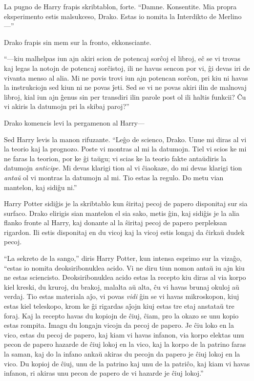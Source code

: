 La pugno de Harry frapis skribtablon, forte. ``Damne. Konsentite. Mia propra eksperimento estis malsukceso, Drako. Estas io nomita la Interdikto de Merlino—''

Drako frapis sin mem sur la fronto, ekkonsciante.

``—kiu malhelpas iun ajn akiri scion de potencaj sorĉoj el libroj, eĉ
se vi trovas kaj legas la notojn de potencaj sorĉistoj, ili ne havus
sencon por vi, ĝi devas iri de vivanta menso al alia. Mi ne povis
trovi iun ajn potencan sorĉon, pri kiu ni havas la instrukciojn sed
kiun ni ne povas ĵeti. Sed se vi ne povas akiri ilin de malnovaj
libroj, kial iun ajn ĝenus sin per transdiri ilin parole post ol ili
haltis funkcii? Ĉu vi akiris la datumojn pri la skibaj paroj?''

Drako komencis levi la pergamenon al Harry—

Sed Harry levis la manon rifuzante. ``Leĝo de scienco, Drako. Unue mi
diras al vi la teorio kaj la prognozo. Poste vi montras al mi la
datumojn. Tiel vi scios ke mi ne faras la teorion, por ke ĝi taŭgu; vi
scias ke la teorio fakte antaŭdiris la datumojn \emph{anticipe.} Mi
devas klarigi tion al vi ĉiaokaze, do mi devas klarigi tion
\emph{antaŭ} ol vi montras la datumojn al mi. Tio estas la regulo. Do
metu vian mantelon, kaj sidiĝu ni.''

Harry Potter sidiĝis je la skribtablo kun ŝiritaj pecoj de papero
disponitaj sur sia surfaco. Drako elirigis sian mantelon el sia sako,
metis ĝin, kaj sidiĝis je la alia flanko fronte al Harry, kaj donante
al la ŝiritaj pecoj de papero perpleksan rigardon. Ili estis
disponitaj en du vicoj kaj la vicoj estis longaj da ĉirkaŭ dudek
pecoj.


``La sekreto de la sango,'' diris Harry Potter, kun intensa esprimo
sur la vizaĝo, ``estas io nomita deoksiribonuklea acido. Vi ne diru
tiun nomon antaŭ iu ajn kiu ne estas sciencisto. Deoksiribonuklea
acido estas la recepto kiu diras al via korpo kiel kreski, du kruroj,
du brakoj, malalta aŭ alta, ĉu vi havas brunaj okuloj aŭ verdaj. Tio
estas materiala aĵo, vi povas \emph{vidi} ĝin se vi havas mikroskopon,
kiuj estas kiel teleskopo, krom ke ĝi rigardas aĵojn kiuj estas tre
etaj anstataŭ tre foraj. Kaj la recepto havas du kopiojn de ĉiuj, ĉiam,
pro la okazo se unu kopio estas rompita. Imagu du longajn vicojn da
pecoj de papero. Je ĉiu loko en la vico, estas du pecoj de papero, kaj
kiam vi havas infanon, via korpo elektas unu pecon de papero hazarde de
ĉiuj lokoj en la vico, kaj la korpo de la patrino faras la saman, kaj
do la infano ankaŭ akiras du pecojn da papero je ĉiuj lokoj en la
vico. Du kopioj de ĉiuj, unu de la patrino kaj unu de la patriĉo, kaj
kiam vi havas infanon, ri akiras unu pecon de papero de vi hazarde je
ĉiuj lokoj.''

